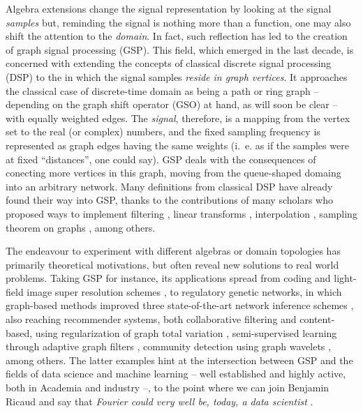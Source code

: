Algebra extensions change the signal representation by looking at the signal \textit{samples} but, reminding the signal is nothing more than a function, one may also shift the attention to the \textit{domain}. In fact, such reflection has led to the creation of graph signal processing (GSP). This field, which emerged in the last decade, is concerned with extending the concepts of classical discrete signal processing (DSP) to the in which the signal samples \textit{reside in graph vertices}. It approaches the classical case of discrete-time domain as being a path or ring graph -- depending on the graph shift operator (GSO) at hand, as will soon be clear -- with equally weighted edges. The \textit{signal}, therefore, is a mapping from the vertex set to the real (or complex) numbers, and the fixed sampling frequency is represented as graph edges having the same weights (i.~e. as if the samples were at fixed ``distances'', one could say). GSP deals with the consequences of conecting more vertices in this graph, moving from the queue-shaped domaing into an arbitrary network. Many definitions from classical DSP have already found their way into GSP, thanks to the contributions of many scholars who proposed ways to implement filtering \cite{sandryhaila2013filters}, linear transforms \cite{sandryhaila2013gft,sardellitti2017graph}, interpolation \cite{segarra2015interpolation}, sampling theorem on graphs \cite{wang2015generalized,chen2016signal,tsitsvero2016signals}, among others.

The endeavour to experiment with different algebras or domain topologies has primarily theoretical motivations, but often reveal new solutions to real world problems. Taking GSP for instance, its applications spread from coding \cite{su2017graph} and light-field image super resolution schemes \cite{rossi2017graph}, to regulatory genetic networks, in which graph-based methods improved three state-of-the-art network inference schemes \cite{pirayre2015brane,pirayre2017brane}, also reaching recommender systems, both collaborative filtering and content-based, using regularization of graph total variation \cite{benzi2016song}, semi-supervised learning through adaptive graph filters \cite{chen2014semi}, community detection using graph wavelets \cite{tremblay2014graph}, among others. The latter examples hint at the intersection between GSP and the fields of data science and machine learning -- well established and highly active, both in Academia and industry --, to the point where we can join Benjamin Ricaud and say that \emph{Fourier could very well be, today, a data scientist} \cite{ricaud2019fourier}.

